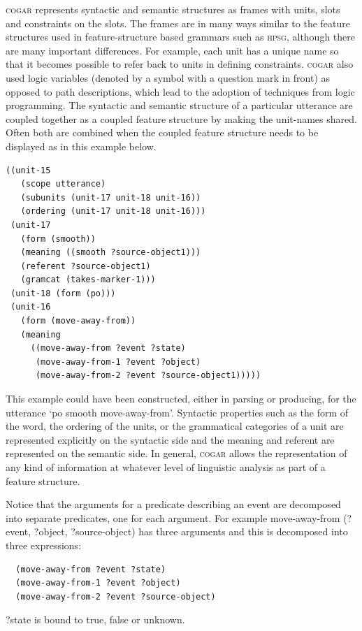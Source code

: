 \textsc{cogar} represents syntactic and semantic structures as frames with units, slots and 
constraints on the slots. The frames are in many ways similar to the feature structures used in feature-structure 
based grammars such as \textsc{hpsg}, although there are many important differences. For example, each unit has a 
unique name so that it becomes possible to refer back to units in defining constraints. \textsc{cogar} also used 
logic variables (denoted by a symbol with a question mark in front) as opposed to path descriptions, which 
lead to the adoption of techniques from logic programming. 
The syntactic and semantic structure of a particular utterance are coupled together as a coupled feature structure 
by making the unit-names shared. Often both are combined when the coupled feature structure needs to be displayed
as in this example below. 
\begin{verbatim}
((unit-15
   (scope utterance)
   (subunits (unit-17 unit-18 unit-16))
   (ordering (unit-17 unit-18 unit-16)))
 (unit-17
   (form (smooth))
   (meaning ((smooth ?source-object1)))
   (referent ?source-object1) 
   (gramcat (takes-marker-1)))
 (unit-18 (form (po)))
 (unit-16 
   (form (move-away-from)) 
   (meaning
     ((move-away-from ?event ?state) 
      (move-away-from-1 ?event ?object)
      (move-away-from-2 ?event ?source-object1)))))
\end{verbatim}
This example could have been constructed, either in parsing or producing, for 
the utterance `po smooth move-away-from'. Syntactic properties such as the form of the word, 
the ordering of the units, or the grammatical categories of a unit are represented explicitly on the syntactic side and 
the meaning and referent are represented on the semantic side. In general, \textsc{cogar} allows the representation of
any kind of information at whatever level of linguistic analysis as part of a feature structure. 

Notice that the arguments for a predicate describing an event are decomposed into separate predicates, one for 
each argument. For example move-away-from (?event, ?object, ?source-object) has three arguments and this 
is decomposed into three expressions: 
\begin{verbatim}
  (move-away-from ?event ?state) 
  (move-away-from-1 ?event ?object)
  (move-away-from-2 ?event ?source-object)
\end{verbatim}
?state is bound to true, false or unknown. 

